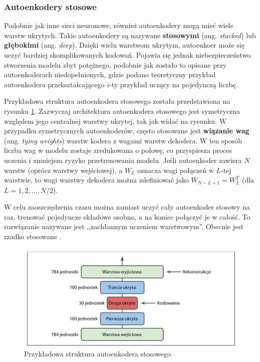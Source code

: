 \documentclass[12pt]{mwbk}
\theoremstyle{plain}
\theoremstyle{definition}
\theoremstyle{remark}
\newcommand\zrodlo[1]{\par\vspace{-3mm}{\small\textit{Źródło: }#1 }}
\begin{document}
\subsubsection{Autoenkodery stosowe}


Podobnie jak inne sieci neuronowe, również autoenkodery mogą mieć wiele warstw ukrytych. Takie autoenkodery są nazywane \textbf{stosowymi} (ang. \emph{stacked}) lub \textbf{głębokimi} (ang. \emph{deep}). Dzięki wielu warstwom ukrytym, autoenkoer może się uczyć bardziej skomplikowanych kodowań. Pojawia się jednak niebezpieczeństwo stworzenia modelu zbyt potężnego, podobnie jak zostało to opisane przy autoenkoderach niedopełnionych, gdzie podano teoretyczny przykład autoenkodera przekształcającego $i$-ty przykład uczący na pojedynczą liczbę.

Przykładowa struktura autoenkodera stosowego została przedstawiona na rysunku \ref{fig:autoenkoder-stosowy}. Zazwyczaj architektura autoenkodera stosowego jest symetryczna względem jego centralnej warstwy ukrytej, tak jak widać na rysunku. 
W przypadku symetrycznych autoenkoderów, często stosowane jest \textbf{wiązanie wag} (ang. \emph{tying weights}) warstw kodera z wagami warstw dekodera. W ten sposób liczba wag w modelu zostaje zredukowana o połowę, co przyspiesza proces uczenia i zmniejsza ryzyko przetrenowania modelu. Jeśli autoenkoder zawiera $N$ warstw (oprócz warstwy wejściowej), a $W_L$ oznacza wagi połączeń w $L$-tej warstwie, to wagi warstwy dekodera można zdefiniować jako $W_{N-L+1}=W_L^T$ (dla $L=1,2,\ldots, N/2$).

W celu zaoszczędzenia czasu można zamiast uczyć cały autoenkoder stosowy na raz, trenować pojedyncze składowe osobno, a na koniec połączyć je w całość. To rozwiązanie nazywane jest ,,zachłannym uczeniem warstwowym''. Obecnie jest rzadko stosowane \cite{geron}.

\begin{figure}[!h]
	\centering
	\includegraphics[width=\linewidth]{rys/autoenkoder_stosowy.png}
	\caption{Przykładowa struktura autoenkodera stosowego}
	\zrodlo{\cite{geron}}
	\label{fig:autoenkoder-stosowy}
\end{figure}
\end{document}
